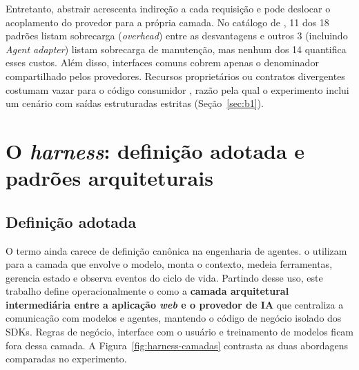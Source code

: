 Entretanto, abstrair acrescenta indireção a cada requisição e pode deslocar o
acoplamento do provedor para a própria camada. No catálogo de ,
11 dos 18 padrões listam sobrecarga (\textit{overhead}) entre as desvantagens e
outros 3 (incluindo \textit{Agent adapter}) listam sobrecarga de manutenção, mas
nenhum dos 14 quantifica esses custos. Além disso, interfaces comuns cobrem
apenas o denominador compartilhado pelos provedores. Recursos proprietários ou
contratos divergentes costumam vazar para o código consumidor
\cite{thoughtworkslitellm}, razão pela qual o experimento inclui um cenário com
saídas estruturadas estritas (Seção~\ref{sec:b1}).

\section{O \textit{harness}: definição adotada e padrões arquiteturais}
\label{sec:harness}

\subsection{Definição adotada}
\label{subsec:harness-definicao}

O termo \harness{} ainda carece de definição canônica na engenharia de agentes.
 o utilizam para a camada que envolve o modelo, monta o
contexto, medeia ferramentas, gerencia estado e observa eventos do ciclo de
vida. Partindo desse uso, este trabalho define operacionalmente o \harness{} como
a \textbf{camada arquitetural intermediária entre a aplicação \textit{web} e o
provedor de IA} que centraliza a comunicação com modelos e agentes, mantendo o
código de negócio isolado dos SDKs. Regras de negócio, interface com o usuário e
treinamento de modelos ficam fora dessa camada. A
Figura~\ref{fig:harness-camadas} contrasta as duas abordagens comparadas no
experimento.

